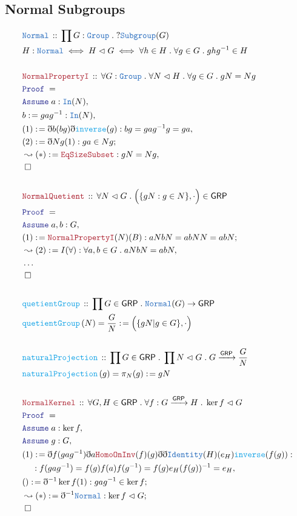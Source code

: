 \documentclass[12pt]{scrartcl}
\newcommand{\TYPE}[1]{\textcolor{NavyBlue}{\mathtt{#1}}}
\newcommand{\FUNC}[1]{\textcolor{Cerulean}{\mathtt{#1}}}
\newcommand{\LOGIC}[1]{\textcolor{Blue}{\mathtt{#1}}}
\newcommand{\THM}[1]{\textcolor{Maroon}{\mathtt{#1}}}
\renewcommand{\.}{\; . \;}
\newcommand{\de}{: \kern 0.1pc =}
\newcommand{\Act}[1]{\left( #1 \right)}
\newcommand{\Theorem}[2]{& \THM{#1} \, :: \, #2 \\ & \Proof = \\ }
\newcommand{\DeclareType}[2]{& \TYPE{#1} \, :: \, #2 \\}
\newcommand{\DefineNamedType}[4]{& #1 : \TYPE{#2} \iff #3 \iff #4 \\}
\newcommand{\DeclareFunc}[2]{& \FUNC{#1} \, :: \, #2 \\}
\newcommand{\DefineNamedFunc}[4]{&  \FUNC{#1}\Act{#2} = #3 \de #4 \\}
\newcommand{\NewLine}{\\ & \kern 1pc}
\newcommand{\Page}[1]{ \begin{align*} #1 \end{align*}   }
\newcommand{ \bd }{ \ByDef }
\newcommand{\NoProof}{ & \ldots \\ \EndProof}
\newcommand{\Say}[3]{& #1 \de #2 : #3, \\}
\newcommand{\Conclude}[3]{& #1 \de #2 : #3; \\}
\newcommand{\Derive}[3]{& \leadsto #1 \de #2 : #3, \\}
\newcommand{\DeriveConclude}[3]{& \leadsto #1 \de #2 : #3 ; \\}
\newcommand{\Assume}[2]{& \LOGIC{Assume} \; #1 : #2, \\}
\newcommand{\QED}{\; \square}
\newcommand{\EndProof}{& \QED \\}
\newcommand{\ByDef}{\eth}
\newcommand{\Proof}{\LOGIC{Proof} \; }
\newcommand{\Group}{\TYPE{Group}}
\newcommand{\Nrml}{\vartriangleleft}
\newcommand{\GRP}{\mathsf{GRP}}
\begin{document}
\subsection{Normal Subgroups}
\Page{
	\DeclareType{Normal}{\prod G : \Group \.  ?\TYPE{Subgroup}(G)  }
	\DefineNamedType{H}{Normal}{H \Nrml G}{ \forall h \in H \. \forall g \in G \. ghg^{-1} \in H   }
	\\
	\Theorem{NormalPropertyI}{\forall G : \Group \. \forall N \Nrml H \.  \forall g \in G \. gN = Ng}
	\Assume{a}{\TYPE{In}(N)}
	\Say{b}{gag^{-1}}{\TYPE{In}(N)}
	\Say{(1)}{\bd b (bg) \bd \FUNC{inverse}(g)}{  bg = gag^{-1}g = ga     }
	\Conclude{(2)}{\bd Ng(1)}{ ga \in Ng  }
	\Derive{(*)}{\THM{EqSizeSubset}}{ gN = Ng  }
	\EndProof
	\\
	\Theorem{NormalQuetient}{\forall N \Nrml G \. \Big(\{gN : g \in N  \},\cdot \Big) \in \GRP}
	\Assume{a,b}{G}
	\Conclude{(1)}{ \THM{NormalPropertyI}(N)(B)  }{ aNbN = abNN = abN  }
	\Derive{(2)}{I(\forall)}{\forall a,b \in G \. aNbN = abN}
	\NoProof
	\\
	\DeclareFunc{quetientGroup}{ \prod G \in \GRP \. \TYPE{Normal}(G) \to \GRP    }
	\DefineNamedFunc{quetientGroup}{  N   }{ \frac{G}{N} }{ \Big( \{ gN | g \in G    \}, \cdot  \Big)}
	\\
	\DeclareFunc{naturalProjection}{\prod G \in \GRP \.  \prod N \Nrml G \. G \xrightarrow{\GRP} \frac{G}{N}}
	\DefineNamedFunc{naturalProjection}{g}{\pi_N(g)}{gN}
	\\
	\Theorem{NormalKernel}{\forall G,H \in \GRP \. \forall f : G \xrightarrow{\GRP} H \. \ker f \Nrml G}
	\Assume{a}{\ker f}
	\Assume{g}{G}
	\Say{(1)}{\bd f (gag^{-1}) \bd a \THM{HomoOnInv}(f)(g)\bd \bd \TYPE{Identity}(H)(e_H) \FUNC{inverse}(f(g))}
	{ 
		\NewLine :
		f(gag^{-1}) = f(g)f(a)f(g^{-1}) = f(g)e_H(f(g))^{-1} = e_H}
	\Conclude{()}{\bd^{-1} \ker f (1)}{gag^{-1} \in \ker f}
	\DeriveConclude{(*)}{\bd^{-1}\TYPE{Normal}}{\ker f \Nrml G}
	\EndProof
}
\end{document}
